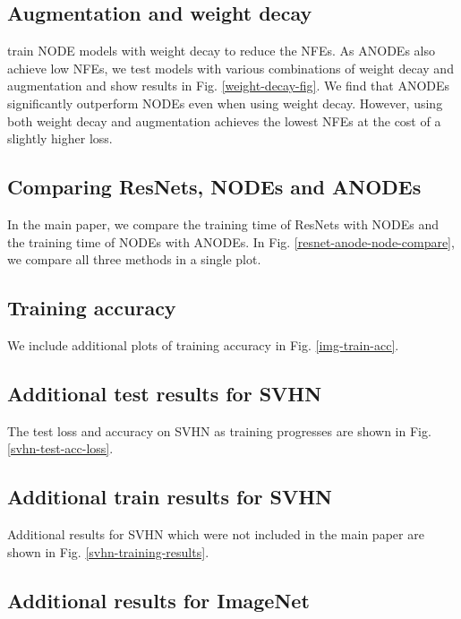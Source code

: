 \documentclass{article}
\begin{document}
\subsection{Augmentation and weight decay}

\cite{grathwohl2018ffjord} train NODE models with weight decay to reduce the NFEs. As ANODEs also achieve low NFEs, we test models with various combinations of weight decay and augmentation and show results in Fig. \ref{weight-decay-fig}. We find that ANODEs significantly outperform NODEs even when using weight decay. However, using both weight decay and augmentation achieves the lowest NFEs at the cost of a slightly higher loss.

\subsection{Comparing ResNets, NODEs and ANODEs}

In the main paper, we compare the training time of ResNets with NODEs and the training time of NODEs with ANODEs. In Fig. \ref{resnet-anode-node-compare}, we compare all three methods in a single plot.

\subsection{Training accuracy}

We include additional plots of training accuracy in Fig. \ref{img-train-acc}.

\subsection{Additional test results for SVHN}

The test loss and accuracy on SVHN as training progresses are shown in Fig. \ref{svhn-test-acc-loss}.

\subsection{Additional train results for SVHN}

Additional results for SVHN which were not included in the main paper are shown in Fig. \ref{svhn-training-results}.

\subsection{Additional results for ImageNet}
\end{document}
